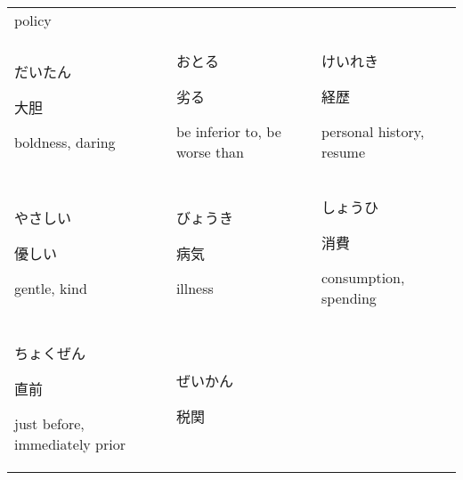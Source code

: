 \documentclass[12pt, a4j, landscape, dvipdfmx]{utarticle}
\begin{document}
\begin{minipage}[t][0pt]{\linewidth }
\begin{tabular}{||p{5.5cm}||p{5.5cm}||p{5.5cm}||}
policy}\tabularnewline \hhline{|:=::=::=:|} \rule{0pt}{3ex} \hspace*{-.4cm} {\LARGE だいたん}\newline \rule{0pt}{3ex} \hspace*{.4cm} {\small 大胆}\newline \rule{0pt}{3ex} \hspace*{.425cm} {\small boldness, daring}&\rule{0pt}{3ex} \hspace*{-.4cm} {\LARGE おとる}\newline \rule{0pt}{3ex} \hspace*{.4cm} {\small 劣る}\newline \rule{0pt}{3ex} \hspace*{.425cm} {\small be inferior to, be worse than}&\rule{0pt}{3ex} \hspace*{-.4cm} {\LARGE けいれき}\newline \rule{0pt}{3ex} \hspace*{.4cm} {\small 経歴}\newline \rule{0pt}{3ex} \hspace*{.425cm} {\small personal history, resume}\tabularnewline \hhline{|:=::=::=:|} \rule{0pt}{3ex} \hspace*{-.4cm} {\LARGE やさしい}\newline \rule{0pt}{3ex} \hspace*{.4cm} {\small 優しい}\newline \rule{0pt}{3ex} \hspace*{.425cm} {\small gentle, kind}&\rule{0pt}{3ex} \hspace*{-.4cm} {\LARGE びょうき}\newline \rule{0pt}{3ex} \hspace*{.4cm} {\small 病気}\newline \rule{0pt}{3ex} \hspace*{.425cm} {\small illness}&\rule{0pt}{3ex} \hspace*{-.4cm} {\LARGE しょうひ}\newline \rule{0pt}{3ex} \hspace*{.4cm} {\small 消費}\newline \rule{0pt}{3ex} \hspace*{.425cm} {\small consumption, spending}\tabularnewline \hhline{|:=::=::=:|} \rule{0pt}{3ex} \hspace*{-.4cm} {\LARGE ちょくぜん}\newline \rule{0pt}{3ex} \hspace*{.4cm} {\small 直前}\newline \rule{0pt}{3ex} \hspace*{.425cm} {\small just before, immediately prior}&\rule{0pt}{3ex} \hspace*{-.4cm} {\LARGE ぜいかん}\newline \rule{0pt}{3ex} \hspace*{.4cm} {\small 税関}\newline \rule{0pt}{3ex} 
\end{tabular}
\end{minipage}
\end{document}
